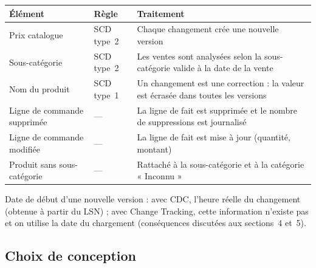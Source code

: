 \documentclass[10pt,a4paper]{article}
\begin{document}
\begingroup\small
\begin{tabularx}{\textwidth}{@{}>{\raggedright\arraybackslash}p{3.6cm}>{\raggedright\arraybackslash}p{2.3cm}X@{}}
\toprule
Élément & Règle & Traitement \\
\midrule
Prix catalogue & SCD type~2 & Chaque changement crée une nouvelle version \\
Sous-catégorie & SCD type~2 & Les ventes sont analysées selon la sous-catégorie valide à la date de la vente \\
Nom du produit & SCD type~1 & Un changement est une correction : la valeur est écrasée dans toutes les versions \\
Ligne de commande supprimée & --- & La ligne de fait est supprimée et le nombre de suppressions est journalisé \\
Ligne de commande modifiée & --- & La ligne de fait est mise à jour (quantité, montant) \\
Produit sans sous-catégorie & --- & Rattaché à la sous-catégorie et à la catégorie « Inconnu » \\
\bottomrule
\end{tabularx}
\endgroup

Date de début d'une nouvelle version : avec CDC, l'heure réelle du changement (obtenue à partir du LSN) ; avec Change Tracking, cette information n'existe pas et on utilise la date du chargement (conséquences discutées aux sections~4 et~5).

\subsection{Choix de conception}
\end{document}
